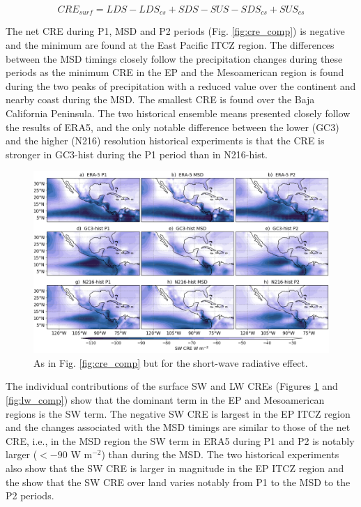 \begin{equation}
CRE_{surf}=  LDS-LDS_{cs}+SDS-SUS-SDS_{cs}+SUS_{cs}
\end{equation}



The net CRE during P1, MSD and P2 periods (Fig. \ref{fig:cre_comp}) is negative  and the minimum are found at the East Pacific ITCZ region. The differences between the MSD timings closely follow the precipitation changes during these periods as the minimum CRE in the EP and the Mesoamerican region is found during the two peaks of precipitation with a reduced value over the continent and nearby coast during the MSD. The smallest CRE is found over the Baja California Peninsula. 
The two historical ensemble means presented closely follow the results of ERA5, and the only notable difference between the lower (GC3) and the higher (N216) resolution historical experiments is that the CRE is stronger in GC3-hist during the P1 period than in N216-hist.

\begin{figure}[t!]
\includegraphics[width=\linewidth]{figures/fig4_swclim_3.png}
\caption[Short-wave cloud radiative effect composites]{As in Fig. \ref{fig:cre_comp} but for the short-wave radiative effect.}
\label{fig:sw_comp}
\end{figure}

The individual contributions of the surface SW and LW CREs (Figures \ref{fig:sw_comp} and \ref{fig:lw_comp}) show that the dominant term in the EP and Mesoamerican regions is the SW term. The negative SW CRE is largest in the EP ITCZ region and the changes associated with the MSD timings are similar to those of the net CRE, i.e., in the MSD region the SW term in ERA5 during P1 and P2 is notably larger ($<-90$ W m$^{-2}$) than during the MSD.
The two historical experiments also show that the SW CRE is larger in magnitude in the EP ITCZ region and the show that the SW CRE over land varies notably from P1 to the MSD to the P2 periods.

